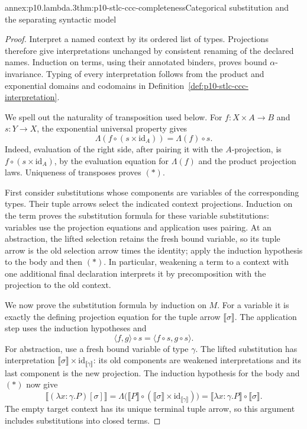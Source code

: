 \begin{annexitem}{annex:p10.lambda.3}{thm:p10-stlc-ccc-completeness}{Categorical substitution and the separating syntactic model}
\begin{proof}
Interpret a named context by its ordered list of types.
Projections therefore give interpretations unchanged by
consistent renaming of the declared names.  Induction on terms,
using their annotated binders, proves bound
\(\alpha\)-invariance.  Typing of every interpretation follows
from the product and exponential domains and codomains in
Definition~\ref{def:p10-stlc-ccc-interpretation}.

We spell out the naturality of transposition used below.
For \(f:X\times A\to B\) and \(s:Y\to X\), the exponential
universal property gives
\[
        \Lambda(f\circ(s\times\mathrm{id}_A))
                             =\Lambda(f)\circ s.             \tag{*}
\]
Indeed, evaluation of the right side, after pairing it with
the \(A\)-projection, is \(f\circ(s\times\mathrm{id}_A)\),
by the evaluation equation for \(\Lambda(f)\) and the product
projection laws.  Uniqueness of transposes proves \((*)\).

First consider substitutions whose components are variables
of the corresponding types.  Their tuple arrows select the
indicated context projections.  Induction on the term proves
the substitution formula for these variable substitutions:
variables use the projection equations and application uses
pairing.  At an abstraction, the lifted selection retains the
fresh bound variable, so its tuple arrow is the old selection
arrow times the identity; apply the induction hypothesis to
the body and then \((*)\).
In particular, weakening a term to a context with one
additional final declaration interprets it by precomposition
with the projection to the old context.

We now prove the substitution formula by induction on \(M\).
For a variable it is exactly the defining projection equation
for the tuple arrow \(\llbracket\sigma\rrbracket\).
The application step uses the induction hypotheses and
\[
                 \langle f,g\rangle\circ s
                         =\langle f\circ s,g\circ s\rangle.
\]
For abstraction, use a fresh bound variable of type \(\gamma\).
The lifted substitution has interpretation
\(\llbracket\sigma\rrbracket\times
 \mathrm{id}_{\llbracket\gamma\rrbracket}\):
its old components are weakened interpretations and its last
component is the new projection.  The induction hypothesis
for the body and \((*)\) now give
\[
 \llbracket(\lambda x{:}\gamma.P)[\sigma]\rrbracket
  =\Lambda\bigl(\llbracket P\rrbracket\circ
       (\llbracket\sigma\rrbracket\times
        \mathrm{id}_{\llbracket\gamma\rrbracket})\bigr)
  =\llbracket\lambda x{:}\gamma.P\rrbracket
          \circ\llbracket\sigma\rrbracket.
\]
The empty target context has its unique terminal tuple arrow,
so this argument includes substitutions into closed terms.


\end{proof}
\end{annexitem}
